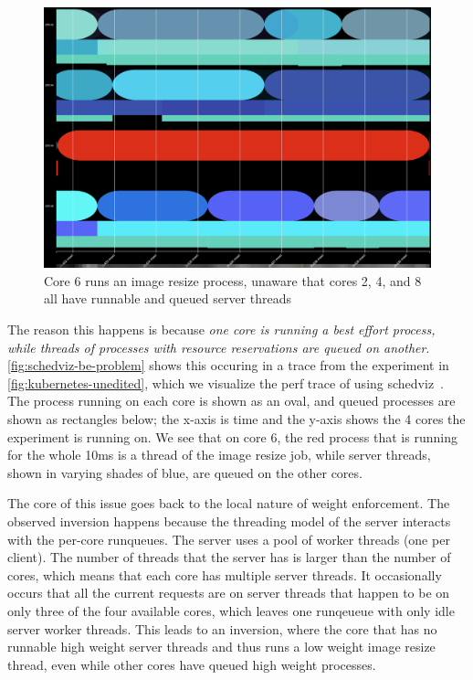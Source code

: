 \begin{figure}[t]
    \centering
    \includegraphics[width=\columnwidth]{graphs/schedviz-be-problem.png}
    \caption{Core 6 runs an image resize process, unaware that cores 2, 4, and 8
    all have runnable and queued server threads}\label{fig:schedviz-be-problem}
\end{figure}

The reason this happens is because \textit{one core is running a best effort
process, while threads of processes with resource reservations are queued on
another}. \autoref{fig:schedviz-be-problem} shows this occuring in a trace from
the experiment in \autoref{fig:kubernetes-unedited}, which we visualize the perf
trace of using schedviz~\cite{schedviz-tool}. The process running on each core
is shown as an oval, and queued processes are shown as rectangles below; the
x-axis is time and the y-axis shows the 4 cores the experiment is running on. We
see that on core 6, the red process that is running for the whole 10ms is a
thread of the image resize job, while server threads, shown in varying shades of
blue, are queued on the other cores. 

The core of this issue goes back to the local nature of \cgroups{} weight
enforcement. The observed inversion happens because the threading model of the
server interacts with the per-core runqueues. The server uses a pool of worker
threads (one per client). The number of threads that the server has is larger
than the number of cores, which means that each core has multiple server
threads. It occasionally occurs that all the current requests are on server
threads that happen to be on only three of the four available cores, which
leaves one runqeueue with only idle server worker threads. This leads to an
inversion, where the core that has no runnable high weight server threads and
thus runs a low weight image resize thread, even while other cores have queued
high weight processes.

